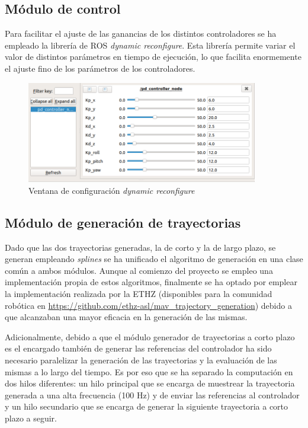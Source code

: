 \subsection{Módulo de control}

Para facilitar el ajuste de las ganancias de los distintos controladores se ha empleado la librería de ROS \textit{dynamic reconfigure}. Esta librería permite variar el valor de distintos parámetros en tiempo de ejecución, lo que facilita enormemente el ajuste fino de los parámetros de los controladores. 
\begin{figure}[htb!]
	\centering
	\includegraphics[width=0.9\textwidth]{imagenes/Rqt}
	\caption{Ventana de configuración \textit{dynamic reconfigure}}
	\label{waypoints:circuito}
\end{figure}




\subsection{Módulo de generación de trayectorias}

Dado que las dos trayectorias generadas, la de corto y la de largo plazo, se generan empleando \textit{splines} se ha unificado el algoritmo de generación en una clase común a ambos módulos. Aunque al comienzo del proyecto se empleo una implementación propia de estos algoritmos, finalmente se ha optado por emplear la implementación realizada por la ETHZ (disponibles para la comunidad robótica en \url{https://github.com/ethz-asl/mav_trajectory_generation}) debido a que alcanzaban una mayor eficacia en la generación de las mismas.

Adicionalmente, debido a que el módulo generador de trayectorias a corto plazo es el encargado también de generar las referencias del controlador ha sido necesario paralelizar la generación de las trayectorias y la evaluación de las mismas a lo largo del tiempo. Es por eso que se ha separado la computación en dos hilos diferentes: un hilo principal que se encarga de muestrear la trayectoria generada a una alta frecuencia (100 Hz) y de enviar las referencias al controlador y un hilo secundario que se encarga de generar la siguiente trayectoria a corto plazo a seguir.





